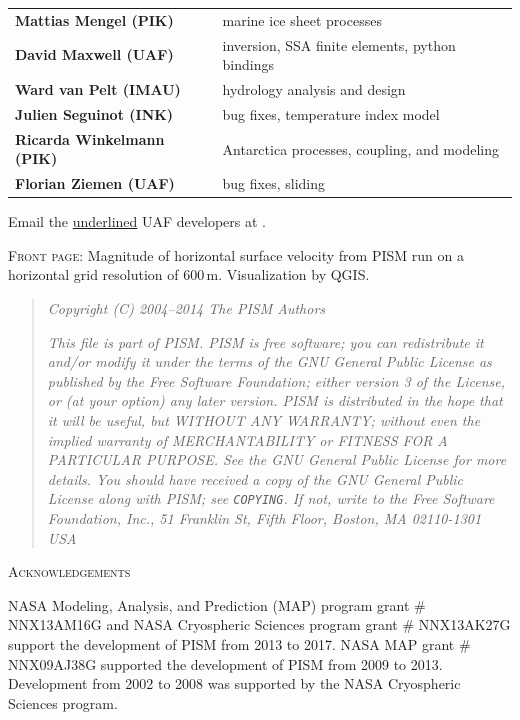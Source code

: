 \documentclass[titlepage,letterpaper,final]{scrartcl}
\begin{document}
\begin{tabular}{ll}
\textbf{Mattias Mengel (PIK)} & marine ice sheet processes \\
\textbf{David Maxwell (UAF)} & inversion, SSA finite elements, python bindings \\
\textbf{Ward van Pelt (IMAU)} & hydrology analysis and design \\
\textbf{Julien Seguinot (INK)} & bug fixes, temperature index model \\
\textbf{Ricarda Winkelmann (PIK)} & Antarctica processes, coupling, and modeling  \\
\textbf{Florian Ziemen (UAF)} & bug fixes, sliding \\
\end{tabular}

\bigskip
\noindent Email the \underline{underlined} UAF developers at \qquad \PISMEMAIL.

\bigskip\bigskip
\noindent \textsc{Front page}:  Magnitude of horizontal surface velocity from PISM run on a horizontal grid resolution of 600\,m.  Visualization by QGIS.

\vfill

\newpage
\vspace{0.2in}
\begin{quote}
\textsl{Copyright (C) 2004--2014 The PISM Authors}
\medskip

\noindent \textsl{This file is part of PISM.  PISM is free software; you can redistribute it and/or modify it under the terms of the GNU General Public License as published by the Free Software Foundation; either version 3 of the License, or (at your option) any later version.  PISM is distributed in the hope that it will be useful, but WITHOUT ANY WARRANTY; without even the implied warranty of MERCHANTABILITY or FITNESS FOR A PARTICULAR PURPOSE.  See the GNU General Public License for more details.  You should have received a copy of the GNU General Public License along with PISM; see \emph{\texttt{COPYING}}.  If not, write to the Free Software Foundation, Inc., 51 Franklin St, Fifth Floor, Boston, MA  02110-1301 USA}
\end{quote}
\vspace{0.5in}

\centerline{\textsc{Acknowledgements}}
\bigskip

\small
NASA Modeling, Analysis, and Prediction (MAP) program grant \# NNX13AM16G and NASA Cryospheric Sciences program grant \# NNX13AK27G support the development of PISM from 2013 to 2017.  NASA MAP grant \# NNX09AJ38G supported the development of PISM from 2009 to 2013.  Development from 2002 to 2008 was supported by the NASA Cryospheric Sciences program.
\end{document}
